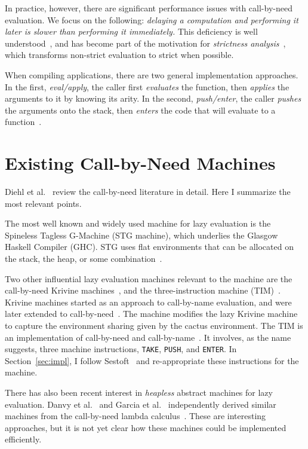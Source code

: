 In practice, however, there are significant performance issues with call-by-need
evaluation.  We focus on the following: \emph{delaying a computation and
performing it later is slower than performing it immediately.} This deficiency
is well understood~\cite{johnsson1984efficient,jonesstg}, and has become part of
the motivation for \emph{strictness
analysis}~\cite{mycroft1982abstract,wadler1987projections}, which transforms
non-strict evaluation to strict when possible.

When compiling applications, there are two general implementation approaches.
In the first, \emph{eval/apply}, the caller first \emph{evaluates} the function,
then \emph{applies} the arguments to it by knowing its arity. In the second,
\emph{push/enter}, the caller \emph{pushes} the arguments onto the stack, then
\emph{enters} the code that will evaluate to a function~\cite{marlow2006making}.  

\section{Existing Call-by-Need Machines}

Diehl et al.~\cite{diehl2000abstract} review the call-by-need
literature in detail.  Here I summarize the most relevant points.

The most well known and widely used machine for lazy evaluation is the
Spineless Tagless G-Machine (STG machine), which underlies the Glasgow Haskell
Compiler (GHC).  STG uses flat environments that can be allocated on the stack,
the heap, or some combination~\cite{jonesstg}.  

Two other influential lazy evaluation machines relevant to the \ce 
machine are the call-by-need Krivine
machines~\cite{lkm,krivine2007call,sestoft}, and the three-instruction machine
(TIM)~\cite{TIM}.  Krivine machines started as an approach to call-by-name
evaluation, and were later extended to
call-by-need~\cite{krivine2007call,sestoft,danvy2013synthetic,lkm}.  The \ce
machine modifies the lazy Krivine machine to capture the environment sharing
given by the cactus environment. The TIM is an implementation of call-by-need
and call-by-name~\cite{TIM}.  It involves, as the name suggests, three machine
instructions, \texttt{TAKE}, \texttt{PUSH}, and \texttt{ENTER}. In
Section~\ref{sec:impl}, I follow Sestoft~\cite{sestoft} and
re-appropriate these instructions for the \ce machine.

There has also been recent interest in \emph{heapless} abstract
machines for lazy evaluation. Danvy et al.~\cite{danvy2012inter} and
Garcia et al.~\cite{garcia2009lazy} independently derived similar
machines from the call-by-need lambda calculus~\cite{ariola1995call}. These are interesting approaches, but it is not yet
clear how these machines could be implemented efficiently.

